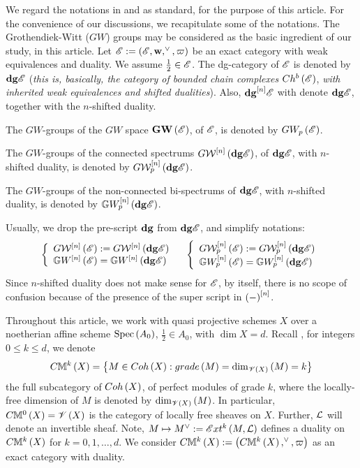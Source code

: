 \documentclass[12pt]{article}
\begin{document}
\bN\label{NotaConv}{\rm
We  regard the notations in \cite[App C]{M25l} and \cite{M23} as standard, for the purpose of this article. 
For the convenience of our discussions, we recapitulate some of the notations.
The Grothendiek-Witt ($GW$) groups may be considered as the basic ingredient of our study, in this article. 
Let ${\SE}:=\LRf{{\SE}, {\bfw}, ^{\vee}, \varpi}$  be an exact category with weak equivalences and duality. We assume 
$\frac{1}{2}\in {\SE}$. 
The dg-category of ${\SE}$ is denoted by ${\bf dg}{\SE}$ ({\it this is, basically, the category of bounded chain complexes } 
$Ch^b\LRf{{\SE}}$, {\it with inherited weak equivalences and shifted dualities}). Also, ${\bf dg}^{\LRt{n}}{\SE}$ with denote ${\bf dg}{\SE}$, together with the $n$-shifted duality. 
%  
\bE 
\item The $GW$-groups of the $GW$ space ${\bf GW}\LRf{{\SE}}$, of ${\SE}$, is denoted by $GW_p\LRf{{\SE}}$. 
\item The $GW$-groups of the connected spectrums $G{\CW}^{\LRt{n}}\LRf{{\bf dg}{\SE}}$, of ${\bf dg}{\SE}$, with $n$-shifted duality, is denoted by $G{\CW}_p^{\LRt{n}}\LRf{{\bf dg}{\SE}}$. %
\item The $GW$-groups of the non-connected bi-spectrums of ${\bf dg}{\SE}$, with $n$-shifted duality, is denoted by ${\BG}{W}_p^{\LRt{n}}\LRf{{\bf dg}{\SE}}$. 

\item 
 Usually, we drop the pre-script ${\bf dg}$ from ${\bf dg}{\SE}$, and   simplify notations:
$$
\LBrace{{l} 
G{\CW}^{\LRt{n}}\LRf{{\SE}}:=G{\CW}^{\LRt{n}}\LRf{{\bf dg}{\SE}}\\
{\BG}{W}^{\LRt{n}}\LRf{{\SE}}={\BG}{W}^{\LRt{n}}\LRf{{\bf dg}{\SE}}\\
}
\quad
\LBrace{{l} 
G{\CW}_p^{\LRt{n}}\LRf{{\SE}}:=G{\CW}_p^{\LRt{n}}\LRf{{\bf dg}{\SE}}\\
{\BG}{W}_p^{\LRt{n}}\LRf{{\SE}}={\BG}{W}_p^{\LRt{n}}\LRf{{\bf dg}{\SE}}\\
}
$$
Since $n$-shifted duality does not make sense for ${\SE}$, by itself, there is no scope of confusion because of  the presence of the super script in $\LRf{-}^{\LRt{n}}$. 
\item Throughout this article, we work with quasi projective schemes $X$ over a noetherian affine scheme 
$\spec{A_0}$, $\frac{1}{2}\in A_0$, with $\dim X=d$. Recall \cite{M23, M25}, for integers $0\leq k\leq d$,
we  denote %
$$
C{\BM}^k\LRf{X}=\LRs{
M\in Coh\LRf{X}: grade\LRf{M}=\dim_{{\SV}\LRf{X}}\LRf{M}=k}
$$
the full subcategory of $Coh\LRf{X}$, of perfect modules of grade $k$,
where   the locally-free dimension of $M$ is denoted by $\dim_{{\SV}\LRf{X}}\LRf{M}$. In particular, $C{\BM}^0\LRf{X}={\SV}\LRf{X}$ is the category of locally free sheaves on $X$. 
%
Further, ${\CL}$ will denote an invertible sheaf. Note, $M \mapsto M^{\vee}:={\SE}xt^k\LRf{M, {\CL}}$ defines a duality 
on $C{\BM}^k\LRf{X}$ for $k=0, 1, \ldots, d$.  We consider $C{\BM}^k\LRf{X}:=\LRf{C{\BM}^k\LRf{X}, ^{\vee}, \varpi}$ as an exact category with duality. 

}
\end{document}
